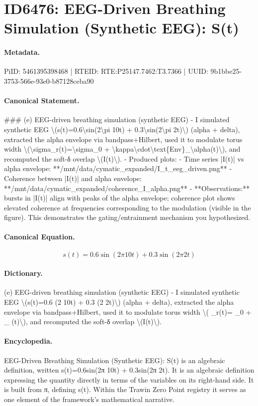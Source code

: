 \section*{ID6476: EEG-Driven Breathing Simulation (Synthetic EEG): S(t)}
\paragraph{Metadata.}
PiID: 5461395398468 | RTEID: RTE:P25147.7462:T3.7366 | UUID: 9b1bbe25-3753-566e-93e0-b87128ceba90

\paragraph{Canonical Statement.}
\#\#\# (e) EEG-driven breathing simulation (synthetic EEG) - I simulated synthetic EEG \textbackslash{}(s(t)=0.6\textbackslash{}sin(2\textbackslash{}pi 10t) + 0.3\textbackslash{}sin(2\textbackslash{}pi 2t)\textbackslash{}) (alpha + delta), extracted the alpha envelope via bandpass+Hilbert, used it to modulate torus width \textbackslash{}(\textbackslash{}sigma\_r(t)=\textbackslash{}sigma\_0 + \textbackslash{}kappa\textbackslash{}cdot\textbackslash{}text\{Env\}\_\textbackslash{}alpha(t)\textbackslash{}), and recomputed the soft-δ overlap \textbackslash{}(I(t)\textbackslash{}). - Produced plots: - Time series |I(t)| vs alpha envelope: **/mnt/data/cymatic\_expanded/I\_t\_eeg\_driven.png** - Coherence between |I(t)| and alpha envelope: **/mnt/data/cymatic\_expanded/coherence\_I\_alpha.png** - **Observations:** bursts in |I(t)| align with peaks of the alpha envelope; coherence plot shows elevated coherence at frequencies corresponding to the modulation (visible in the figure). This demonstrates the gating/entrainment mechanism you hypothesized.

\paragraph{Canonical Equation.}
\[
s(t)=0.6\sin(2\pi 10t) + 0.3\sin(2\pi 2t)
\]

\paragraph{Dictionary.}
(e) EEG-driven breathing simulation (synthetic EEG) - I simulated synthetic EEG \textbackslash{}(s(t)=0.6 (2 10t) + 0.3 (2 2t)\textbackslash{}) (alpha + delta), extracted the alpha envelope via bandpass+Hilbert, used it to modulate torus width \textbackslash{}( \_r(t)= \_0 + \_ (t)\textbackslash{}), and recomputed the soft-δ overlap \textbackslash{}(I(t)\textbackslash{}).

\paragraph{Encyclopedia.}
EEG-Driven Breathing Simulation (Synthetic EEG): S(t) is an algebraic definition, written s(t)=0.6sin(2π 10t) + 0.3sin(2π 2t). It is an algebraic definition expressing the quantity directly in terms of the variables on its right-hand side. It is built from π, defining s(t). Within the Trawin Zero Point registry it serves as one element of the framework's mathematical narrative.
